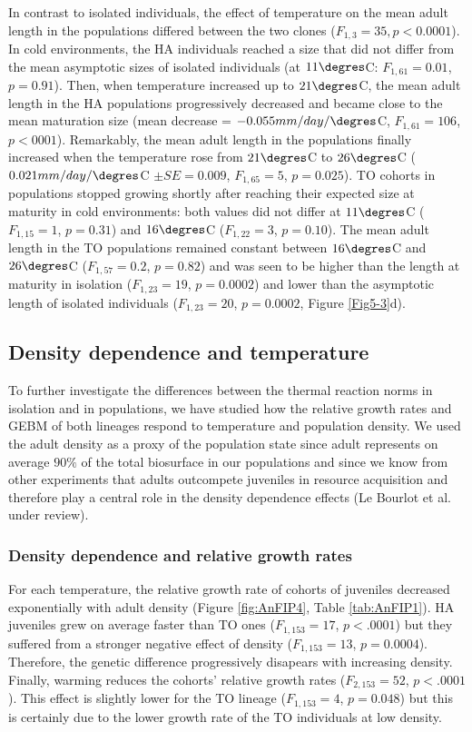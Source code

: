 In contrast to isolated individuals, the effect of temperature on the mean adult
length in the populations differed between the two clones ($F_{1,3}=35,
p<0.0001$).
In cold environments, the HA individuals reached a size that did not differ from
the mean asymptotic sizes of isolated individuals (at $11\degres$C: $F_{1,61} =
0.01$, $p = 0.91$). Then, when temperature increased up to $21\degres$C, the
mean adult length in the HA populations progressively decreased and became close
to the mean maturation size (mean decrease = $-0.055 mm/day/\degres$C, $F_{1,61}
= 106$, $p < 0001$).
Remarkably, the mean adult length in the populations finally increased when the
temperature rose from $21\degres$C to $26\degres$C ($0.021 mm/day/\degres$C $\pm
SE=0.009$, $F_{1,65} = 5$, $p = 0.025$).
TO cohorts in populations stopped growing shortly after reaching their expected
size at maturity in cold environments: both values did not differ at
$11\degres$C ($F_{1,15} = 1$, $p = 0.31$)  and $16\degres$C ($F_{1,22} = 3$, $p
= 0.10$).
The mean adult length in the TO populations remained constant between
$16\degres$C and $26\degres$C ($F_{1,57}=0.2$, $p=0.82$) and was seen to be
higher than the length at maturity in isolation ($F_{1,23}=19$, $p=0.0002$) and
lower than the asymptotic length of isolated individuals ($F_{1,23}=20$,
$p=0.0002$, Figure \ref{Fig5-3}d).


\subsection{Density dependence and temperature}

To further investigate the differences between the thermal reaction norms in
isolation and in populations, we have studied how the relative growth rates and
GEBM of both lineages respond to temperature and population density. We used the
adult density as a proxy of the population state since adult represents on
average $90\%$ of the total biosurface in our populations and since we know from
other experiments that adults outcompete juveniles in resource acquisition and
therefore play a central role in the density dependence effects (Le Bourlot et
al. under review).

\subsubsection{Density dependence and relative growth rates}

For each temperature, the relative growth rate of cohorts of juveniles decreased
exponentially with adult density (Figure \ref{fig:AnFIP4}, Table
\ref{tab:AnFIP1}).
HA juveniles grew on average faster than TO ones ($F_{1,153} = 17$, $p < .0001$)
but they suffered from a stronger negative effect of density ($F_{1,153} = 13$,
$p = 0.0004$). Therefore, the genetic difference progressively disapears with
increasing density. Finally, warming reduces the cohorts’ relative growth rates
($F_{2,153} = 52$, $p < .0001$). This effect is slightly lower for the TO
lineage ($F_{1,153} = 4$, $p = 0.048$) but this is certainly due to the lower
growth rate of the TO individuals at low density.

